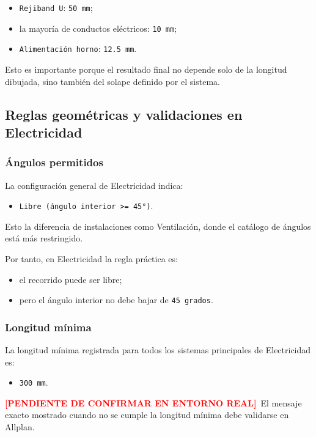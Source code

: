 \documentclass[12pt,a4paper]{article}
\newcommand{\pendingtag}{\textcolor{red}{\textbf{[PENDIENTE DE CONFIRMAR EN ENTORNO REAL]}}}
\begin{document}
\begin{itemize}
\item \texttt{Rejiband U}: \texttt{50 mm};
\item la mayoría de conductos eléctricos: \texttt{10 mm};
\item \texttt{Alimentación horno}: \texttt{12.5 mm}.
\end{itemize}

Esto es importante porque el resultado final no depende solo de la longitud dibujada, sino también del solape definido por el sistema.

\subsection{Reglas geométricas y validaciones en Electricidad}

\subsubsection{Ángulos permitidos}

La configuración general de Electricidad indica:

\begin{itemize}
\item \texttt{Libre (ángulo interior >= 45°)}.
\end{itemize}

Esto la diferencia de instalaciones como Ventilación, donde el catálogo de ángulos está más restringido.

Por tanto, en Electricidad la regla práctica es:

\begin{itemize}
\item el recorrido puede ser libre;
\item pero el ángulo interior no debe bajar de \texttt{45 grados}.
\end{itemize}

\subsubsection{Longitud mínima}

La longitud mínima registrada para todos los sistemas principales de Electricidad es:

\begin{itemize}
\item \texttt{300 mm}.
\end{itemize}

\pendingtag\ El mensaje exacto mostrado cuando no se cumple la longitud mínima debe validarse en Allplan.
\end{document}
